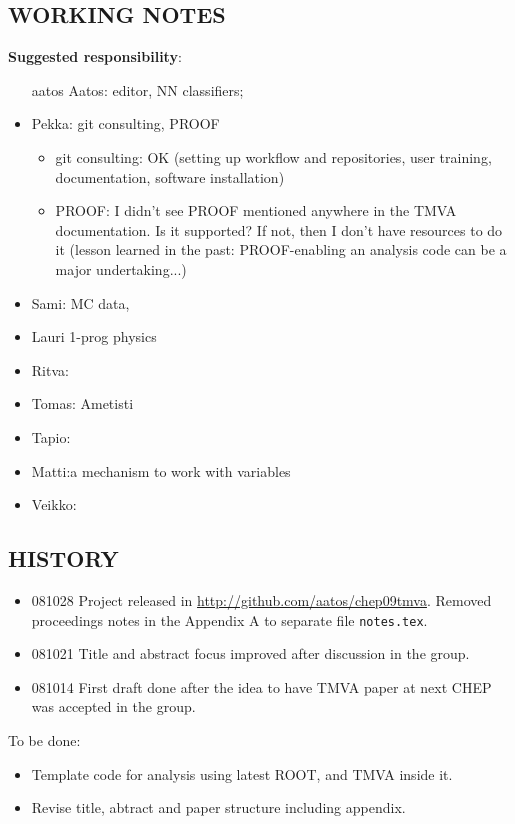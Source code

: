 \begin{appendix}
\section{WORKING NOTES}
{\bf Suggested  responsibility}: 
\begin{itemize}
\item[aatos]
Aatos: editor, NN classifiers; 
\item Pekka: git consulting, PROOF
\begin{itemize}
\item git consulting: OK (setting up workflow and repositories, user
  training, documentation, software installation)
\item PROOF: I didn't see PROOF mentioned anywhere in the TMVA
  documentation. Is it supported? If not, then I don't have resources
  to do it (lesson learned in the past: PROOF-enabling an analysis
  code can be a major undertaking...)
\end{itemize}
\item Sami: MC data, 
\item Lauri 1-prog physics
\item Ritva: 
\item Tomas: Ametisti
\item Tapio: 
\item Matti:a mechanism to work with variables 
\item Veikko:
\end{itemize}
\subsection{HISTORY}
\begin{itemize}
\item 081028 Project released in \url{http://github.com/aatos/chep09tmva}. Removed proceedings notes in the Appendix A to separate file {\tt notes.tex}.
\item 081021 Title and abstract focus improved after discussion in the group. 
\item 081014 First draft done after the idea to have TMVA paper at next CHEP was accepted in the group.
\end{itemize}

To be done:
\begin{itemize}
\item Template code for  analysis using latest ROOT, and TMVA inside it.
\item Revise title, abtract and paper structure including appendix.
\end{itemize}


\end{appendix}
